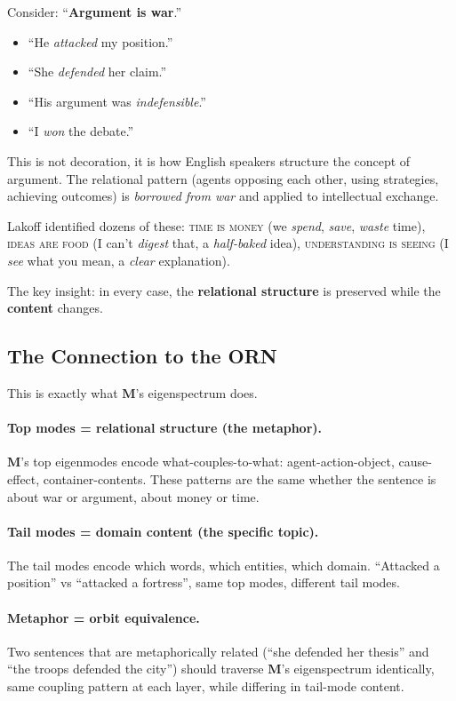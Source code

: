 \documentclass[11pt, a4paper]{article}
\newcommand{\M}{\mathbf{M}}
\theoremstyle{remark}
\begin{document}
Consider: ``\textbf{Argument is war}.''
\begin{itemize}[nosep]
    \item ``He \emph{attacked} my position.''
    \item ``She \emph{defended} her claim.''
    \item ``His argument was \emph{indefensible}.''
    \item ``I \emph{won} the debate.''
\end{itemize}

This is not decoration, it is how English speakers structure the concept of argument.
The relational pattern (agents opposing each other, using strategies, achieving outcomes) is \emph{borrowed from war} and applied to intellectual exchange.

Lakoff identified dozens of these: \textsc{time is money} (we \emph{spend}, \emph{save}, \emph{waste} time), \textsc{ideas are food} (I can't \emph{digest} that, a \emph{half-baked} idea), \textsc{understanding is seeing} (I \emph{see} what you mean, a \emph{clear} explanation).

The key insight: in every case, the \textbf{relational structure} is preserved while the \textbf{content} changes.

\subsection{The Connection to the ORN}

This is exactly what $\M$'s eigenspectrum does.

\paragraph{Top modes = relational structure (the metaphor).}
$\M$'s top eigenmodes encode what-couples-to-what: agent-action-object, cause-effect, container-contents.
These patterns are the same whether the sentence is about war or argument, about money or time.

\paragraph{Tail modes = domain content (the specific topic).}
The tail modes encode which words, which entities, which domain.
``Attacked a position'' vs ``attacked a fortress'', same top modes, different tail modes.

\paragraph{Metaphor = orbit equivalence.}
Two sentences that are metaphorically related (``she defended her thesis'' and ``the troops defended the city'') should traverse $\M$'s eigenspectrum identically, same coupling pattern at each layer, while differing in tail-mode content.
\end{document}
